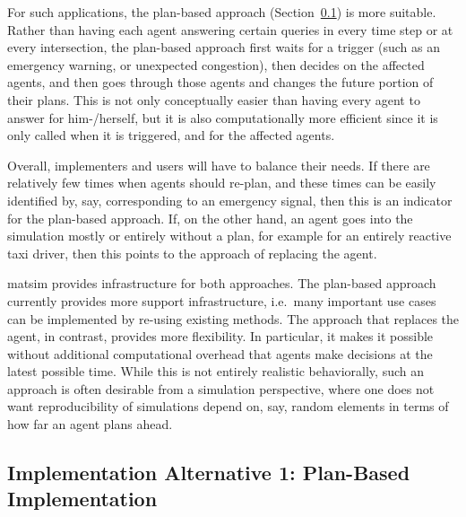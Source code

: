 For such applications, the plan-based approach (Section~\ref{sec:impl-plan-based}) is more suitable.  Rather than having each agent answering certain queries in every time step or at every intersection, the plan-based approach first waits for a trigger (such as an emergency warning, or unexpected congestion), then decides on the affected agents, and then goes through those agents and changes the future portion of their plans.   This is not only conceptually easier than having every agent to answer for him-/herself, but it is also computationally more efficient since it is only called when it is triggered, and for the affected agents. 

Overall, implementers and users will have to balance their needs.  
%
If there are relatively few times when agents should re-plan, and these times can be easily identified by, say, corresponding to an emergency signal, then this is an indicator for the plan-based approach.  
%
If, on the other hand, an agent goes into the simulation mostly or entirely without a plan, for example for an entirely reactive taxi driver, then this points to the approach of replacing the agent.

\acrshort{matsim} provides infrastructure for both approaches.  The plan-based approach currently provides more support infrastructure, i.e.\ many important use cases can be implemented by re-using existing methods.  The approach that replaces the agent, in contrast, provides more flexibility.  In particular, it makes it possible without additional computational overhead that agents make decisions at the latest possible time.  While this is not entirely realistic behaviorally, such an approach is often desirable from a simulation perspective, where one does not want reproducibility of simulations depend on, say, random elements in terms of how far an agent plans ahead.



\subsection{Implementation Alternative 1: Plan-Based Implementation}
\label{sec:impl-plan-based}


